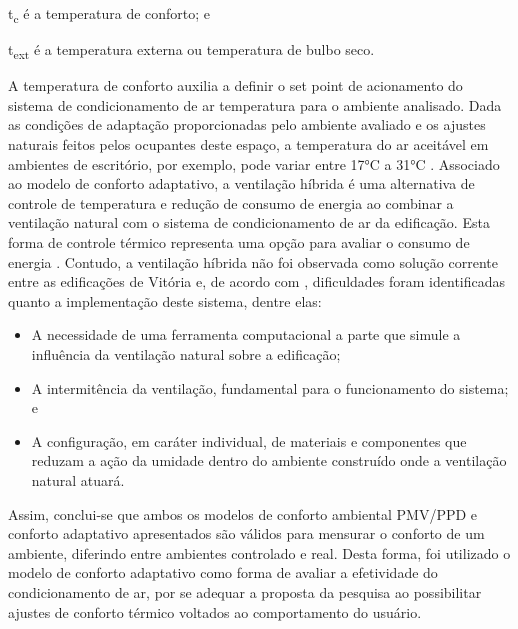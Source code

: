 \setlength\parindent{1.5cm} t\textsubscript{c} é a temperatura de conforto; e\par
\setlength\parindent{1.5cm} t\textsubscript{ext} é a temperatura externa ou temperatura de bulbo seco.\par \vspace{0.25cm}
\noindent A temperatura de conforto auxilia a definir o set point de acionamento do sistema de condicionamento de ar temperatura para o ambiente analisado. Dada as condições de adaptação proporcionadas pelo ambiente avaliado e os ajustes naturais feitos pelos ocupantes deste espaço, a temperatura do ar aceitável em ambientes de escritório, por exemplo, pode variar entre 17°C a 31°C \cite{AmericanSocietyofHeatingRefrigeratingandAir-ConditioningEngineers-ASHRAE2017a}.\vspace*{0.3cm} \newline
Associado ao modelo de conforto adaptativo, a ventilação híbrida é uma alternativa de controle de temperatura e redução de consumo de energia ao combinar a ventilação natural com o sistema de condicionamento de ar da edificação. Esta forma de controle térmico representa uma opção para avaliar o consumo de energia \cite{AmericanSocietyofHeatingRefrigeratingandAir-ConditioningEngineers-ASHRAE2017}.\vspace*{0.3cm} \newline
Contudo, a ventilação híbrida não foi observada como solução corrente entre as edificações de Vitória e, de acordo com \textcite{Shaviv2001,Zhang2014,Navarro2016,SCHULZE2018,Sudhakar2019}, dificuldades foram identificadas quanto a implementação deste sistema, dentre elas:
\begin{itemize}
    \item A necessidade de uma ferramenta computacional a parte que simule a influência 
    da ventilação natural sobre a edificação;
    \item A intermitência da ventilação, fundamental para o funcionamento do sistema; e
    \item A configuração, em caráter individual, de materiais e componentes que reduzam 
    a ação da umidade dentro do ambiente construído onde a ventilação natural atuará.
\end{itemize}
Assim, conclui-se que ambos os modelos de conforto ambiental PMV/PPD e conforto adaptativo apresentados são válidos para mensurar o conforto de um ambiente, diferindo entre ambientes controlado e real. Desta forma, foi utilizado o modelo de conforto adaptativo como forma de avaliar a efetividade do condicionamento de ar, por se adequar a proposta da pesquisa ao possibilitar ajustes de conforto térmico voltados ao comportamento do usuário.
